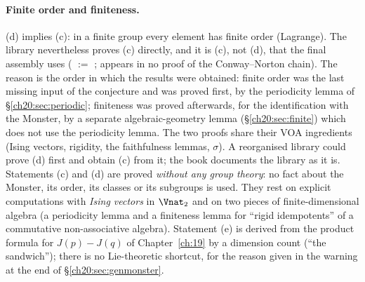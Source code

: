 \paragraph{Finite order and finiteness.}  (d) implies (c): in a finite group every element has finite order (Lagrange).
The library nevertheless proves (c) directly, and it is (c), not (d), that the final assembly uses
( $:=$  ;
 appears in no proof of the Conway--Norton chain).  The reason is the order in which the results were
obtained: finite order was the last missing input of the conjecture and was proved first, by the periodicity lemma of
\S\ref{ch20:sec:periodic}; finiteness was proved afterwards, for the identification with the Monster, by a separate
algebraic-geometry lemma (\S\ref{ch20:sec:finite}) which does not use the periodicity lemma.  The two proofs share their
VOA ingredients (Ising vectors, rigidity, the faithfulness lemmas, $\sigma$).  A reorganised library could prove (d) first and
obtain (c) from it; the book documents the library as it is.
Statements (c) and (d) are proved \emph{without any group theory}: no fact about the Monster, its order, its
classes or its subgroups is used.  They rest on explicit computations with \emph{Ising vectors} in $\Vnat_2$ and on
two pieces of finite-dimensional algebra (a periodicity lemma and a finiteness lemma for ``rigid idempotents'' of a
commutative non-associative algebra).  Statement (e) is derived from the product formula for $J(p)-J(q)$ of
Chapter~\ref{ch:19} by a dimension count (``the sandwich''); there is no Lie-theoretic shortcut, for the reason given in
the warning at the end of \S\ref{ch20:sec:genmonster}.

